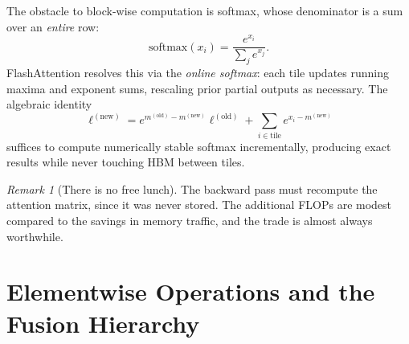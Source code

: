 \documentclass[11pt,a4paper]{article}
\theoremstyle{definition}
\theoremstyle{remark}
\newtheorem{remark}[definition]{Remark}
\theoremstyle{plain}
\begin{document}
\begin{center}
\end{center}


The obstacle to block-wise computation is softmax, whose denominator is a sum over an \emph{entire} row:
\begin{equation}
\mathrm{softmax}(x_i) = \frac{e^{x_i}}{\sum_j e^{x_j}}.
\end{equation}
FlashAttention resolves this via the \emph{online softmax}: each tile updates running maxima and exponent sums, rescaling prior partial outputs as necessary. The algebraic identity
\begin{equation}
\ell^{(\text{new})} = e^{m^{(\text{old})} - m^{(\text{new})}} \ell^{(\text{old})} + \sum_{i \in \text{tile}} e^{x_i - m^{(\text{new})}}
\end{equation}
suffices to compute numerically stable softmax incrementally, producing exact results while never touching HBM between tiles.

\begin{remark}[There is no free lunch]
The backward pass must recompute the attention matrix, since it was never stored. The additional FLOPs are modest compared to the savings in memory traffic, and the trade is almost always worthwhile.
\end{remark}

\section{Elementwise Operations and the Fusion Hierarchy}
\label{sec:fusion}
\end{document}
